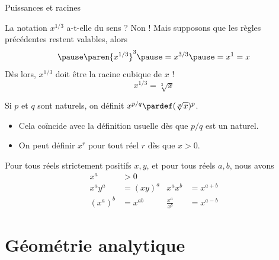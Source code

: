 \documentclass[french,xcolor=svgnames]{beamer}
\begin{document}
\begin{frame}{Puissances et racines}%
  \begin{example}
    La notation \(x^{1/3}\) a-t-elle du sens ? \pause Non ! Mais\pause{}
    supposons que les règles précédentes restent valables, alors
    \begin{equation*}\pause
      \paren{x^{1/3}}^{3} \pause= x^{3/3} \pause= x^{1} = x
    \end{equation*}\pause
    Dès lors, \(x^{1/3}\) doit être la racine cubique de \(x\) !\pause
    \begin{equation*}
      x^{1/3} = \sqrt[3]{x}
    \end{equation*}
  \end{example}\pause
  \begin{definition}
    Si \(p\) et \(q\) sont naturels, on définit \(x^{p/q} \pardef (\sqrt[q]{x})^{p}\).
  \end{definition}\pause
  \begin{remark}
    \begin{itemize}
    \item Cela coïncide avec la définition usuelle dès que \(p/q\) est un naturel.\pause
    \item On peut définir \(x^{r}\) pour tout réel \(r\) dès que \(x > 0\).
    \end{itemize}
  \end{remark}
\end{frame}
\begin{frame}
  \begin{property}%
    \label{resultat-puissances}
    Pour tous réels strictement positifs \(x,y\), et pour tous réels \(a,b\), nous avons\pause
    \begin{align}
      x^{a} &> 0\\
      x^{a} y^{a} &= (xy)^{a}  & x^{a} x^{b} &= x^{a+b}\\
      (x^{a})^{b} &= x^{ab} & \frac{x^{a}}{x^{b}} &= x^{a-b}
    \end{align}
  \end{property}
\end{frame}

\section{Géométrie analytique}
\end{document}
